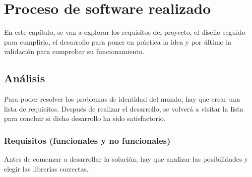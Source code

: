 \chapter{Proceso de software realizado}\label{Proceso de software ejecutado}

\thispagestyle{fancy}


En este capítulo, se van a explorar los requisitos del proyecto, el diseño seguido para cumplirlo, el desarrollo para poner en práctica la idea y por último la validación para comprobar su funcionamiento.

\section{Análisis}
Para poder resolver los problemas de identidad del mundo, hay que crear una lista de requisitos. Después de realizar el desarrollo, se volverá a visitar la lista para concluir si dicho desarrollo ha sido satisfactorio.

\subsection{Requisitos (funcionales y no funcionales)}
Antes de comenzar a desarrollar la solución, hay que analizar las posibilidades y elegir las librerías correctas.

